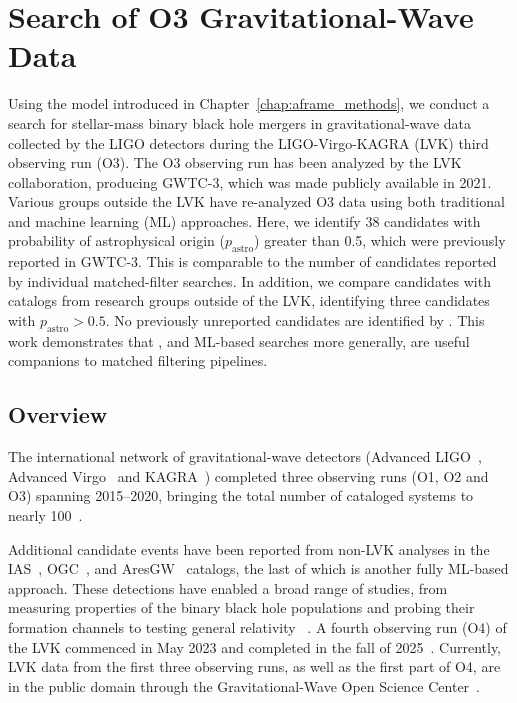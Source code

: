 
\chapter{\aframe Search of O3 Gravitational-Wave Data}
\label{chap:o3_catalog}

\begin{refsection}

Using the \aframe model introduced in Chapter~\ref{chap:aframe_methods}, we conduct a search for stellar-mass binary black hole mergers in gravitational-wave data collected by the LIGO detectors during the LIGO-Virgo-KAGRA (LVK) third observing run (O3).
The O3 observing run has been analyzed by the LVK collaboration, producing GWTC-3, which was made publicly available in 2021. 
Various groups outside the LVK have re-analyzed O3 data using both traditional and machine learning (ML) approaches. 
Here, we identify 38 candidates with probability of astrophysical origin ($p_\mathrm{astro}$) greater than 0.5, which were previously reported in GWTC-3. 
This is comparable to the number of candidates reported by individual matched-filter searches. 
In addition, we compare \aframe candidates with catalogs from research groups outside of the LVK, identifying three candidates with $p_\mathrm{astro} > 0.5$. 
No previously unreported candidates are identified by \aframe. 
This work demonstrates that \aframe, and ML-based searches more generally, are useful companions to matched filtering pipelines.


\section{Overview}

\begin{sloppypar}
The international network of gravitational-wave detectors (Advanced LIGO~\cite{Aasi_2015}, Advanced Virgo~\cite{Acernese_2015} and KAGRA~\cite{kagra}) completed three observing runs (O1, O2 and O3) spanning 2015--2020, bringing the total number of cataloged systems to nearly 100~\cite{Abbott_2023}.
\end{sloppypar}
Additional candidate events have been reported from non-LVK analyses in the IAS~\cite{ias_o3a, ias_o3b}, OGC~\cite{3-ogc, 4-ogc}, and AresGW~\cite{ares_gw_o3} catalogs, the last of which is another fully ML-based approach.
These detections have enabled a broad range of studies, from measuring properties of the binary black hole populations and probing their formation channels to testing general relativity ~\cite{testing-gr, gwtc-3-astro}.
A fourth observing run (O4) of the LVK commenced in May 2023 and completed in the fall of 2025~\cite{o4_plans}.
Currently, LVK data from the first three observing runs, as well as the first part of O4, are in the public domain through the Gravitational-Wave Open Science Center~\cite{Abbott_2023_open_data}.


\end{refsection}
